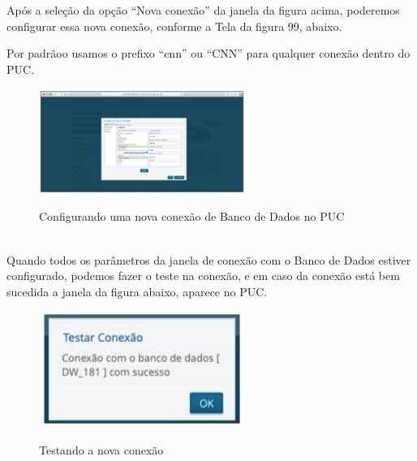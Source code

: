 Ap\'{o}s a sele\c{c}\~{a}o da op\c{c}\~{a}o ``Nova conex\~{a}o'' da janela da figura acima, poderemos configurar essa nova 
conex\~{a}o, conforme a Tela da figura 99, abaixo.

Por padr\~{a}oo usamos o prefixo ``cnn'' ou ``CNN'' para qualquer conex\~{a}o dentro do PUC.

\begin{figure}[H]
	\vspace*{0,2cm}
    \centering
    \caption{Configurando uma nova conex\~{a}o de Banco de Dados no PUC}
    \includegraphics[width=0.6\textwidth]{./04-figuras/figura-puc-conexao-bd}
    \label{fig:ilustfigpucconexaobd}
\end{figure}
\vspace*{-0,9cm}
{\raggedright {}} \\

Quando todos os par\^{a}metros da janela de conex\~{a}o com o Banco de Dados estiver configurado, 
podemos fazer o teste na conex\~{a}o, e em caso da conex\~{a}o est\'{a} bem sucedida a janela da figura abaixo, aparece no PUC.

\begin{figure}[H]
	\vspace*{0,2cm}
    \centering
    \caption{Testando a nova conex\~{a}o}
    \includegraphics[width=0.6\textwidth]{./04-figuras/figura-puc-testando-uma-nova-conexao}
    \label{fig:ilustfigppuctestandoumanovaconexao}
\end{figure}
\vspace*{-0,9cm}
{\raggedright {}} \\


